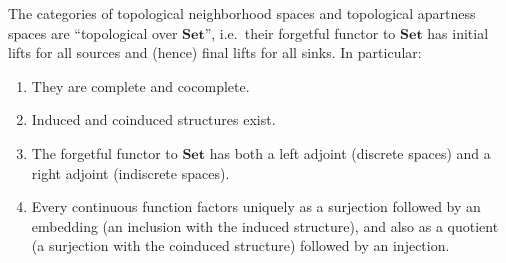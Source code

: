 \documentclass{article}
\begin{document}
\begin{thm}\label{thm:top-topconcrete}
  The categories of topological neighborhood spaces and topological apartness spaces are ``topological over $\mathbf{Set}$'', i.e.\ their forgetful functor to $\mathbf{Set}$ has initial lifts for all sources and (hence) final lifts for all sinks.
  In particular:
  \begin{enumerate}
  \item They are complete and cocomplete.
  \item Induced and coinduced structures exist.
  \item The forgetful functor to $\mathbf{Set}$ has both a left adjoint (discrete spaces) and a right adjoint (indiscrete spaces).
  \item Every continuous function factors uniquely as a surjection followed by an embedding (an inclusion with the induced structure), and also as a quotient (a surjection with the coinduced structure) followed by an injection.
  \end{enumerate}
\end{thm}
\end{document}
